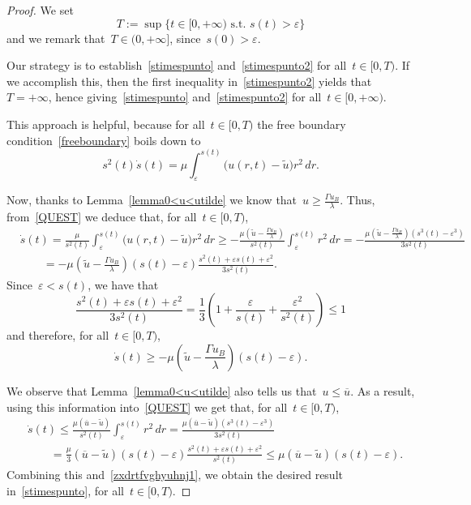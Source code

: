 \documentclass[12pt,a4paper,intlimits,sumlimits]{amsart}
\theoremstyle{definition}
\theoremstyle{plain}
\numberwithin{equation}{section}
\renewcommand{\leq}{\leqslant}
\renewcommand{\le}{\leqslant}
\renewcommand{\geq}{\geqslant}
\renewcommand{\ge}{\geqslant}
\begin{document}
\begin{proof} We set $$
T:=\sup\{ t\in[0,+\infty) {\mbox{ s.t. }} s(t)>\varepsilon \}$$
and we remark that~$T\in(0,+\infty]$, since~$s(0)>\varepsilon$.

Our strategy is to establish~\eqref{stimespunto}
and~\eqref{stimespunto2} for all~$t\in[0,T)$. If we accomplish this,
then the first inequality in~\eqref{stimespunto2} yields that~$T=+\infty$,
hence giving~\eqref{stimespunto}
and~\eqref{stimespunto2} for all~$t\in[0,+\infty)$.

This approach is helpful, because for all~$t\in[0,T)$
the free boundary condition~\eqref{freeboundary} boils down to
\begin{equation}\label{QUEST}s^2(t)\dot s(t)=\mu\int_\varepsilon^{s(t)}\big(u(r,t)-\widetilde u\big)r^2\,dr.\end{equation}

Now,
thanks to Lemma~\ref{lemma0<u<utilde} we know that~$u\ge\frac{\Gamma u_B}{\lambda}$. Thus,
from~\eqref{QUEST} we deduce that, for all~$t\in[0,T)$,
\begin{equation*}\begin{split}&
\dot{s}(t)
=\frac{\mu}{s^2(t)}\int_\varepsilon^{s(t)}\big(u(r,t)-\widetilde u\big)r^2\,dr
\geq-\frac{\mu\left(\widetilde u-\frac{\Gamma u_B}{\lambda}\right)}{s^2(t)}\int_\varepsilon^{s(t)}r^2\,dr=
-\frac{\mu\left(\widetilde u-\frac{\Gamma u_B}{\lambda}\right)(s^3(t)-\varepsilon^3)}{3s^2(t)}\\&\qquad
=
-\mu\left(\widetilde u-\frac{\Gamma u_B}{\lambda}\right)(s(t)-\varepsilon)\frac{s^2(t)+\varepsilon s(t)+\varepsilon^2}{3s^2(t)}.\end{split}
\end{equation*}
Since~$\varepsilon<s(t)$, we have that
$$ \frac{s^2(t)+\varepsilon s(t)+\varepsilon^2}{3s^2(t)}=
\frac13\left(1+\frac{\varepsilon}{s(t)}+\frac{\varepsilon^2}{s^2(t)}\right)\le 1
$$ and therefore, for all~$t\in[0,T)$,
\begin{equation}\label{zxdrtfvghyuhnj1} \dot{s}(t)
\ge -\mu\left(\widetilde u-\frac{\Gamma u_B}{\lambda}\right)(s(t)-\varepsilon). \end{equation}

We observe that Lemma~\ref{lemma0<u<utilde} also tells us that~$u\le \overline{u}$. As a result,
using this information into~\eqref{QUEST} we get that, for all~$t\in[0,T)$,
\begin{equation*}
\begin{split}
&\dot{s}(t)\leq \frac{\mu(\overline{u}-\widetilde u)}{s^2(t)}\int_\varepsilon^{s(t)}r^2\,dr
=\frac{\mu(\overline{u}-\widetilde u)(s^3(t)-\varepsilon^3)}{3s^2(t)}
\\&\qquad=\frac{\mu}{3}(\overline{u}-\widetilde u)(s(t)-\varepsilon)\frac{s^2(t)+\varepsilon s(t)+\varepsilon^2}{s^2(t)}
\le \mu(\overline{u}-\widetilde u)(s(t)-\varepsilon).
\end{split}
\end{equation*}
Combining this and~\eqref{zxdrtfvghyuhnj1}, we obtain the desired result in~\eqref{stimespunto}, for all~$t\in[0,T)$.


\end{proof}
\end{document}
